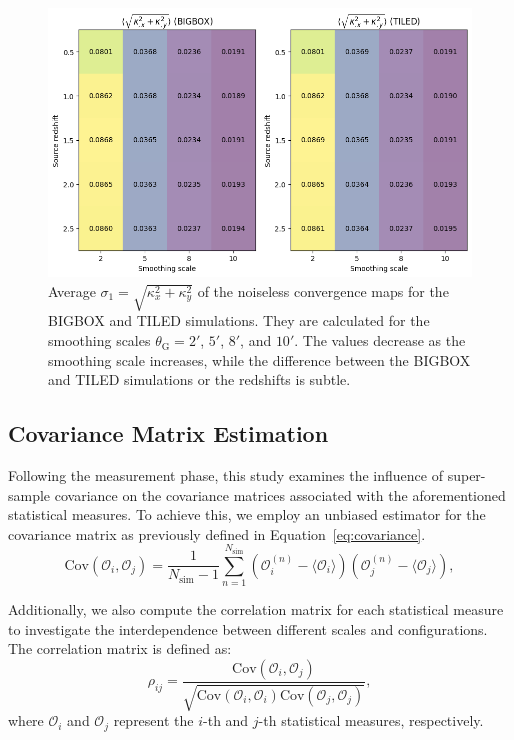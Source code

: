 \begin{figure}[ht]
    \centering
    \includegraphics[width=\textwidth]{figures/avg_sigma1.png}
    \caption{Average $\sigma_1 = \sqrt{\kappa_{x}^2 + \kappa_{y}^2}$ of the noiseless convergence maps for the BIGBOX and TILED simulations. They are calculated for the smoothing scales $\theta_{\mathrm{G}} = 2'$, $5'$, $8'$, and $10'$. The values decrease as the smoothing scale increases, while the difference between the BIGBOX and TILED simulations or the redshifts is subtle.
    } \label{fig:avg_sigma1}
\end{figure}

\subsection{Covariance Matrix Estimation}
Following the measurement phase, this study examines the influence of super-sample covariance on the covariance matrices associated with the aforementioned statistical measures. To achieve this, we employ an unbiased estimator for the covariance matrix as previously defined in Equation~\ref{eq:covariance}. 
\begin{equation}
    \label{eq:covariance}
    \mathrm{Cov}(\mathcal{O}_i, \mathcal{O}_j) = \frac{1}{N_{\mathrm{sim}} - 1} \sum_{n=1}^{N_{\mathrm{sim}}} (\mathcal{O}_i^{(n)} - \langle \mathcal{O}_i \rangle) (\mathcal{O}_j^{(n)} - \langle \mathcal{O}_j \rangle),
\end{equation}

Additionally, we also compute the correlation matrix for each statistical measure to investigate the interdependence between different scales and configurations. The correlation matrix is defined as:
\begin{equation}
    \rho_{ij} = \frac{\text{Cov}(\mathcal{O}_i, \mathcal{O}_j)}{\sqrt{\text{Cov}(\mathcal{O}_i, \mathcal{O}_i)\text{Cov}(\mathcal{O}_j, \mathcal{O}_j)}},
\end{equation}
where $\mathcal{O}_i$ and $\mathcal{O}_j$ represent the $i$-th and $j$-th statistical measures, respectively.


